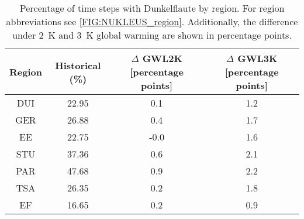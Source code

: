 \begin{table}[!htbp]
\centering
\caption{Percentage of time steps with Dunkelflaute by region. For region abbreviations see \autoref{FIG:NUKLEUS_region}. Additionally, the difference under \qty{2}{\kelvin} and \qty{3}{\kelvin} global warming are shown in percentage points.}
\label{Table:Dunkelflaute_regions}
\begin{tabular}{cccc}
\hline
Region & Historical (\%) & $\Delta$ GWL2K [percentage points] & $\Delta$ GWL3K [percentage points] \\
\hline
DUI & 22.95 & 0.1 & 1.2\\

GER & 26.88 & 0.4 & 1.7\\

EE & 22.75 & -0.0 & 1.6\\

STU & 37.36 & 0.6 & 2.1\\

PAR & 47.68 & 0.9 & 2.2\\

TSA & 26.35 & 0.2 & 1.8\\

EF & 16.65 & 0.2 & 0.9\\

\bottomrule
\end{tabular}
\end{table}
